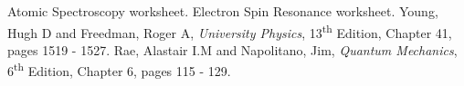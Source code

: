 \documentclass{article}
\begin{document}
\begin{thebibliography}{9}
 Atomic Spectroscopy worksheet.
 Electron Spin Resonance worksheet. 
 Young, Hugh D and Freedman, Roger A, \textit{University Physics}, 13\textsuperscript{th} Edition, Chapter 41, pages 1519 - 1527.
 Rae, Alastair I.M and Napolitano, Jim, \textit{Quantum Mechanics}, 6\textsuperscript{th} Edition, Chapter 6, pages 115 - 129.
\end{thebibliography}
\end{document}
